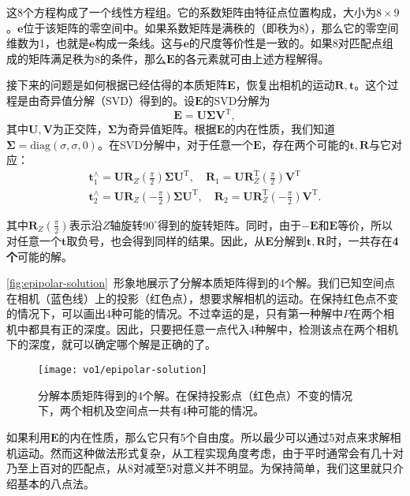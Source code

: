 这8个方程构成了一个线性方程组。它的系数矩阵由特征点位置构成，大小为$8 \times 9$。$\bm{e}$位于该矩阵的零空间中。如果系数矩阵是满秩的（即秩为8），那么它的零空间维数为1，也就是$\bm{e}$构成一条线。这与$\bm{e}$的尺度等价性是一致的。如果8对匹配点组成的矩阵满足秩为8的条件，那么$\bm{E}$的各元素就可由上述方程解得。

接下来的问题是如何根据已经估得的本质矩阵$\bm{E}$，恢复出相机的运动$\bm{R}, \bm{t}$。这个过程是由奇异值分解（SVD）得到的。设$\bm{E}$的SVD分解为
\begin{equation}
\bm{E} = \bm{U} \bm{\Sigma} \bm{V}^\mathrm{T},
\end{equation}
其中$\bm{U}, \bm{V}$为正交阵，$\bm{\Sigma}$为奇异值矩阵。根据$\bm{E}$的内在性质，我们知道$\bm{\Sigma} = \mathrm{diag}( \sigma, \sigma, 0 )$。在SVD分解中，对于任意一个$\bm{E}$，存在两个可能的$\bm{t}, \bm{R}$与它对应：
\begin{equation}
\begin{array}{l}
\bm{t}_1^ \wedge  = \bm{U}{\bm{R}_Z}(\frac{\pi }{2}) \bm{\Sigma} {\bm{U}^\mathrm{T}}, \quad {\bm{R}_1} = \bm{U} \bm{R}_Z^\mathrm{T}(\frac{\pi }{2}){ \bm{V}^\mathrm{T}}\\
\bm{t}_2^ \wedge  = \bm{U}{\bm{R}_Z}( - \frac{\pi }{2})\bm{\Sigma} {\bm{U}^\mathrm{T}}, \quad  {\bm{R}_2} = \bm{U} \bm{R}_Z^\mathrm{T}( - \frac{\pi }{2}){\bm{V}^\mathrm{T}}.
\end{array}
\end{equation}

其中$\bm{R}_Z\left(\frac{\pi }{2}\right)$表示沿$Z$轴旋转$90^\circ$得到的旋转矩阵。同时，由于$-\bm{E}$和$\bm{E}$等价，所以对任意一个$\bm{t}$取负号，也会得到同样的结果。因此，从$\bm{E}$分解到$\bm{t}, \bm{R}$时，一共存在\textbf{4个}可能的解。

\autoref{fig:epipolar-solution}~形象地展示了分解本质矩阵得到的4个解。我们已知空间点在相机（蓝色线）上的投影（红色点），想要求解相机的运动。在保持红色点不变的情况下，可以画出4种可能的情况。不过幸运的是，只有第一种解中$P$在两个相机中都具有正的深度。因此，只要把任意一点代入4种解中，检测该点在两个相机下的深度，就可以确定哪个解是正确的了。

\begin{figure}[!htp]
	\centering
	\texttt{[image: vo1/epipolar-solution]}
	\caption{分解本质矩阵得到的4个解。在保持投影点（红色点）不变的情况下，两个相机及空间点一共有4种可能的情况。}
	\label{fig:epipolar-solution}
\end{figure}

如果利用$\bm{E}$的内在性质，那么它只有5个自由度。所以最少可以通过5对点来求解相机运动\textsuperscript{\cite{Li2006, Nister2004a}}。然而这种做法形式复杂，从工程实现角度考虑，由于平时通常会有几十对乃至上百对的匹配点，从8对减至5对意义并不明显。为保持简单，我们这里就只介绍基本的八点法。

